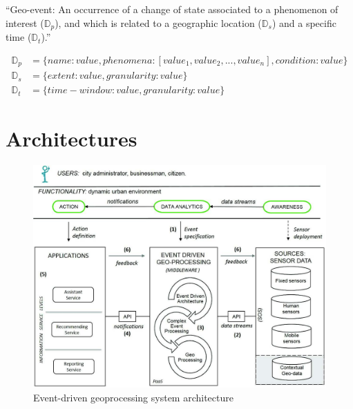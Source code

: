\documentclass[]{scrartcl}
\begin{document}
\enquote{Geo-event: An occurrence of a change of state associated to a phenomenon of interest ($\mathbb{D}_p$), and which is related to a geographic location ($\mathbb{D}_s$) and a specific time ($\mathbb{D}_t$).}~\cite[p.~3]{Morales.2015}

\begin{align*}
	\mathbb{D}_p &= \{name: value, phenomena: [value_1, value_2, ..., value_n], condition: value\} \\
	\mathbb{D}_s &= \{extent: value, granularity: value\} \\
	\mathbb{D}_t &= \{time-window: value, granularity: value\}
\end{align*}


\section{Architectures}

\begin{figure}[h]
	\centering
	\includegraphics[width=\textwidth]{Morales_2015}
	\caption{Event-driven geoprocessing system architecture~\cite[p.~3]{Morales.2015}}
	\label{fig:morales-arch}
\end{figure}
\end{document}
